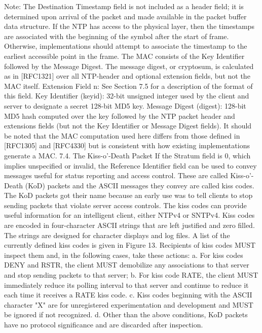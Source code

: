  Note: The Destination Timestamp field is not included as a header
 field; it is determined upon arrival of the packet and made available
 in the packet buffer data structure.
 If the NTP has access to the physical layer, then the timestamps are
 associated with the beginning of the symbol after the start of frame.
 Otherwise, implementations should attempt to associate the timestamp
 to the earliest accessible point in the frame.
 The MAC consists of the Key Identifier followed by the Message
 Digest. The message digest, or cryptosum, is calculated as in
 [RFC1321] over all NTP-header and optional extension fields, but not
 the MAC itself.
 Extension Field n: See Section 7.5 for a description of the format of
 this field.
 Key Identifier (keyid): 32-bit unsigned integer used by the client
 and server to designate a secret 128-bit MD5 key.
 Message Digest (digest): 128-bit MD5 hash computed over the key
 followed by the NTP packet header and extensions fields (but not the
 Key Identifier or Message Digest fields).
 It should be noted that the MAC computation used here differs from
 those defined in [RFC1305] and [RFC4330] but is consistent with how
 existing implementations generate a MAC.
7.4. The Kiss-o’-Death Packet
 If the Stratum field is 0, which implies unspecified or invalid, the
 Reference Identifier field can be used to convey messages useful for
 status reporting and access control. These are called Kiss-o’-Death
 (KoD) packets and the ASCII messages they convey are called kiss
 codes. The KoD packets got their name because an early use was to
 tell clients to stop sending packets that violate server access
 controls. The kiss codes can provide useful information for an
 intelligent client, either NTPv4 or SNTPv4. Kiss codes are encoded
 in four-character ASCII strings that are left justified and zero
 filled. The strings are designed for character displays and log
 files. A list of the currently defined kiss codes is given in
 Figure 13. Recipients of kiss codes MUST inspect them and, in the
 following cases, take these actions:
 a. For kiss codes DENY and RSTR, the client MUST demobilize any
 associations to that server and stop sending packets to that
 server;
 b. For kiss code RATE, the client MUST immediately reduce its
 polling interval to that server and continue to reduce it each
 time it receives a RATE kiss code.
 c. Kiss codes beginning with the ASCII character "X" are for
 unregistered experimentation and development and MUST be ignored
 if not recognized.
 d. Other than the above conditions, KoD packets have no protocol
 significance and are discarded after inspection.
